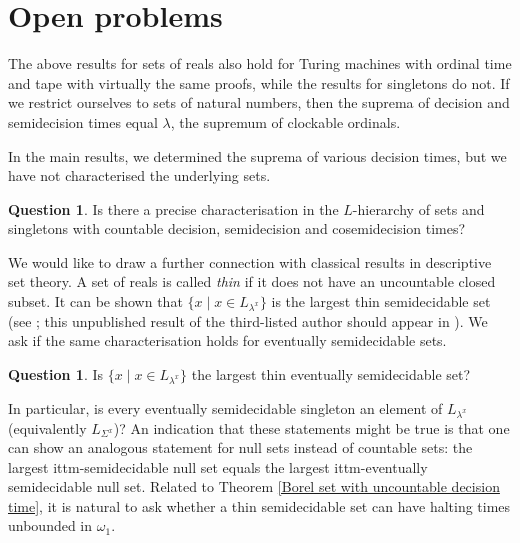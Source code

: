 \documentclass[a4paper,11pt]{amsart}
\theoremstyle{definition}
\newtheorem{question}[fact]{Question}
\newtheorem*{problem A}{Problem 1}
\newtheorem*{problem B}{Problem 2}
\theoremstyle{remark}
\begin{document}


\section{Open problems} 

The above results for sets of reals also hold for Turing machines with ordinal time and tape with virtually the same proofs, while the results for singletons do not. 
If we restrict ourselves to sets of natural numbers, then the suprema of decision and semidecision times 
equal $\lambda$, the supremum of clockable ordinals. 

In the main results, we determined the suprema of various decision times, but we have not characterised the underlying sets. 

\begin{question} 
Is there a precise characterisation in the $L$-hierarchy of sets and singletons with countable decision, semidecision and cosemidecision times? 
\end{question} 


We would like to draw a further connection with classical results in descriptive set theory. 
A set of reals is called \emph{thin} if it does not have an uncountable closed subset. 
It can be shown that $\{x\mid x \in L_{\lambda^x}\}$ is the largest thin semidecidable set 
(see \cite[Definition 1.6]{W}; this unpublished result of the third-listed author should appear in \cite{countableranks}).
We ask if the same characterisation holds for eventually semidecidable sets. 

\begin{question} 
Is $\{x\mid x \in L_{\lambda^x}\}$ the largest thin eventually semidecidable set? 
\end{question} 


In particular, is every eventually semidecidable singleton an element of $L_{\lambda^x}$ (equivalently $L_{\Sigma^x}$)? 
An indication that these statements might be true is that one can show an analogous statement for null sets instead of countable sets: the largest ittm-semidecidable null set equals the largest ittm-eventually semidecidable null set. 
Related to Theorem \ref{Borel set with uncountable decision time}, it is natural to ask whether a thin semidecidable set can have halting times unbounded in $\omega_1$. 
\end{document}
